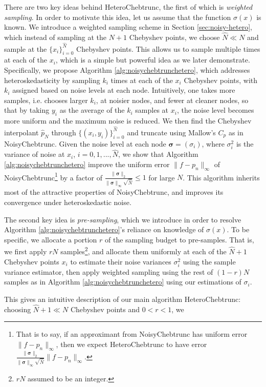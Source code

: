 \documentclass[pdflatex,sn-mathphys-num]{sn-jnl}%
\theoremstyle{thmstyleone}%
\theoremstyle{thmstyletwo}%
\theoremstyle{thmstylethree}%
\begin{document}
There are two key ideas behind HeteroChebtrunc, the first of which is \emph{weighted sampling}. In order to motivate this idea, let us assume that the function $\sigma(x)$ is known. We introduce a weighted sampling scheme in Section \ref{sec:noisy-hetero}, which instead of sampling at the $N+1$ Chebyshev points, we choose $\hat{N} \ll N$ and sample at the $\{x_i\}_{i=0}^{\hat{N}}$ Chebyshev points. This allows us to sample multiple times at each of the $x_i$, which is a simple but powerful idea as we later demonstrate. Specifically, we propose Algorithm \ref{alg:noisychebtrunchetero}, which addresses heteroskedasticity by sampling $k_i$ times at each of the $x_i$ Chebyshev points, with $k_i$ assigned based on noise levels at each node. Intuitively, one takes more samples, i.e. chooses larger $k_i$, at noisier nodes, and fewer at cleaner nodes, so that by taking $y_i$ as the average of the $k_i$ samples at $x_i$, the noise level becomes more uniform and the maximum noise is reduced. We then find the Chebyshev interpolant $\hat{p}_{\hat{N}}$ through $\{(x_i,y_i)\}_{i=0}^{\hat{N}}$ and truncate using Mallow's $C_p$ as in NoisyChebtrunc. Given the noise level at each node $ \bm{\sigma} = (\sigma_i)$, where $\sigma_i^2$ is the variance of noise at $x_i$, $i= 0,1,...,\hat{N}$, we show that Algorithm \ref{alg:noisychebtrunchetero} improve the uniform error $\|f-p_n\|_\infty$ of NoisyChebtrunc\footnote{That is to say, if an approximant from NoisyChebtrunc has uniform error $\|f-p_n\|_\infty$, then we expect HeteroChebtrunc to have error $\frac{\|\bm{\sigma}\|_2}{\|\bm{\sigma}\|_\infty \sqrt{\hat{N}}}\|f-p_n\|_\infty$.} by a factor of $\frac{\|\bm{\sigma}\|_2}{\|\bm{\sigma}\|_\infty \sqrt{\hat{N}}} \leq 1$ for large $N$. This algorithm inherits most of the attractive properties of NoisyChebtrunc, and improves its convergence under heteroskedastic noise. 

The second key idea is \emph{pre-sampling}, which we introduce in order to resolve Algorithm \ref{alg:noisychebtrunchetero}'s reliance on knowledge of $\sigma(x)$. To be specific, we allocate a portion $r$ of the sampling budget to pre-samples. That is, we first apply $rN$ samples\footnote{$rN$ assumed to be an integer.}, and allocate them uniformly at each of the $\hat{N}+1$ Chebyshev points $x_i$ to estimate their noise variances $\sigma_i^2$ using the sample variance estimator, then apply weighted sampling using the rest of $(1-r)N$ samples as in Algorithm \ref{alg:noisychebtrunchetero} using our estimations of $\sigma_i$. 

This gives an intuitive description of our main algorithm HeteroChebtrunc: choosing $\hat{N} +1 \ll N$ Chebyshev points and $0<r<1$, we 
\end{document}
